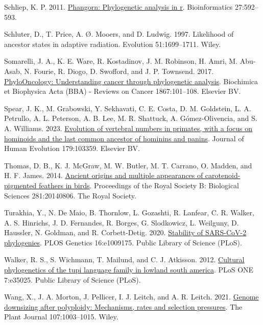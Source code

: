 \documentclass{article}
\newlength{\cslhangindent}
\newenvironment{CSLReferences}[2] %
 {\begin{list}{}{%
  \setlength{\itemindent}{0pt}
  \setlength{\leftmargin}{0pt}
  \setlength{\parsep}{0pt}
  \ifodd #1
   \setlength{\leftmargin}{\cslhangindent}
   \setlength{\itemindent}{-1\cslhangindent}
  \fi
  \setlength{\itemsep}{#2\baselineskip}}}
 {\end{list}}
\begin{document}
\begin{CSLReferences}{1}{0}
Schliep, K. P. 2011. \href{https://doi.org/10.1093/bioinformatics/btq706}{Phangorn: Phylogenetic analysis in r}. Bioinformatics 27:592--593.

Schluter, D., T. Price, A. Ø. Mooers, and D. Ludwig. 1997. Likelihood of ancestor states in adaptive radiation. Evolution 51:1699--1711. Wiley.

Somarelli, J. A., K. E. Ware, R. Kostadinov, J. M. Robinson, H. Amri, M. Abu-Asab, N. Fourie, R. Diogo, D. Swofford, and J. P. Townsend. 2017. \href{https://doi.org/10.1016/j.bbcan.2016.10.006}{PhyloOncology: Understanding cancer through phylogenetic analysis}. Biochimica et Biophysica Acta (BBA) - Reviews on Cancer 1867:101--108. Elsevier BV.

Spear, J. K., M. Grabowski, Y. Sekhavati, C. E. Costa, D. M. Goldstein, L. A. Petrullo, A. L. Peterson, A. B. Lee, M. R. Shattuck, A. Gómez-Olivencia, and S. A. Williams. 2023. \href{https://doi.org/10.1016/j.jhevol.2023.103359}{Evolution of vertebral numbers in primates, with a focus on hominoids and the last common ancestor of hominins and panins}. Journal of Human Evolution 179:103359. Elsevier BV.

Thomas, D. B., K. J. McGraw, M. W. Butler, M. T. Carrano, O. Madden, and H. F. James. 2014. \href{https://doi.org/10.1098/rspb.2014.0806}{Ancient origins and multiple appearances of carotenoid-pigmented feathers in birds}. Proceedings of the Royal Society B: Biological Sciences 281:20140806. The Royal Society.

Turakhia, Y., N. De Maio, B. Thornlow, L. Gozashti, R. Lanfear, C. R. Walker, A. S. Hinrichs, J. D. Fernandes, R. Borges, G. Slodkowicz, L. Weilguny, D. Haussler, N. Goldman, and R. Corbett-Detig. 2020. \href{https://doi.org/10.1371/journal.pgen.1009175}{Stability of SARS-CoV-2 phylogenies}. PLOS Genetics 16:e1009175. Public Library of Science (PLoS).

Walker, R. S., S. Wichmann, T. Mailund, and C. J. Atkisson. 2012. \href{https://doi.org/10.1371/journal.pone.0035025}{Cultural phylogenetics of the tupi language family in lowland south america}. PLoS ONE 7:e35025. Public Library of Science (PLoS).

Wang, X., J. A. Morton, J. Pellicer, I. J. Leitch, and A. R. Leitch. 2021. \href{https://doi.org/10.1111/tpj.15363}{Genome downsizing after polyploidy: Mechanisms, rates and selection pressures}. The Plant Journal 107:1003--1015. Wiley.


\end{CSLReferences}
\end{document}
